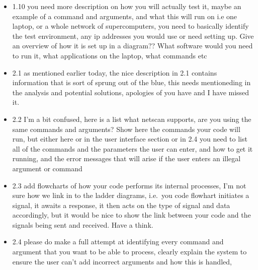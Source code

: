 \documentclass{article}
\begin{document}
\begin{itemize}
  \item{1.10 you need more description on how you will actually test it, maybe an example of a command and arguments, and what this will run on i.e one laptop, or a whole network of supercomputers, you need to basically identify the test environment, any ip addresses you would use or need setting up. Give an overview of how it is set up in a diagram??  What software would you need to run it, what applications on the laptop, what commands etc}

  \item{2.1 as mentioned earlier today, the nice description in 2.1 contains information that is sort of sprung out of the blue, this needs mentioneding in the analysis and potential solutions, apologies of you have and I have missed it.}

  \item{2.2 I'm a bit confused, here is a list what netscan supports, are you using the same commands and arguments? Show here the commands your code will run,  but either here or in the user interface section or in 2.4 you need to list all of the commands and the parameters the user can enter, and how to get it running, and the error messages that will arise if the user enters an illegal argument or command}

  \item{2.3 add flowcharts of how your code performs its internal processes, I'm not sure how we link in to the ladder diagrams, i.e.\ you code flowhart initiates a signal, it awaits a response, it then acts on the type of signal and data accordingly, but it would be nice to show the link between your code and the signals being sent and received. Have a think.}

  \item{2.4 please do make a full attempt at identifying every command and argument that you want to be able to process, clearly explain the system to ensure the user can't add incorrect arguments and how this is handled,}

\end{itemize}
\end{document}

